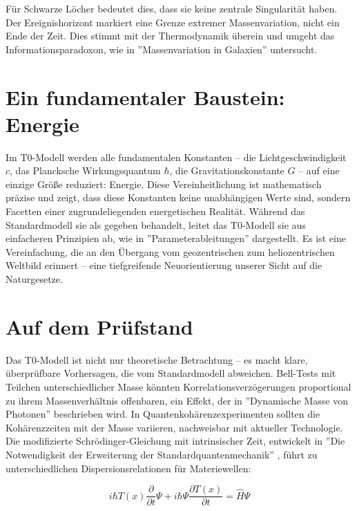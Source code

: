 \documentclass[a4paper,12pt]{article}
\newcommand{\Tfield}{T(x)}
\begin{document}
	Für Schwarze Löcher bedeutet dies, dass sie keine zentrale Singularität haben. Der Ereignishorizont markiert eine Grenze extremer Massenvariation, nicht ein Ende der Zeit. Dies stimmt mit der Thermodynamik überein und umgeht das Informationsparadoxon, wie in ''Massenvariation in Galaxien'' \cite{pascher_galaxies_2025} untersucht.
	
	\section{Ein fundamentaler Baustein: Energie}
	
	Im T0-Modell werden alle fundamentalen Konstanten – die Lichtgeschwindigkeit \(c\), das Plancksche Wirkungsquantum \(\hbar\), die Gravitationskonstante \(G\) – auf eine einzige Größe reduziert: Energie. Diese Vereinheitlichung ist mathematisch präzise und zeigt, dass diese Konstanten keine unabhängigen Werte sind, sondern Facetten einer zugrundeliegenden energetischen Realität. Während das Standardmodell sie als gegeben behandelt, leitet das T0-Modell sie aus einfacheren Prinzipien ab, wie in ''Parameterableitungen'' \cite{pascher_params_2025} dargestellt. Es ist eine Vereinfachung, die an den Übergang vom geozentrischen zum heliozentrischen Weltbild erinnert – eine tiefgreifende Neuorientierung unserer Sicht auf die Naturgesetze.
	
	\section{Auf dem Prüfstand}
	
	Das T0-Modell ist nicht nur theoretische Betrachtung – es macht klare, überprüfbare Vorhersagen, die vom Standardmodell abweichen. Bell-Tests mit Teilchen unterschiedlicher Masse könnten Korrelationsverzögerungen proportional zu ihrem Massenverhältnis offenbaren, ein Effekt, der in ''Dynamische Masse von Photonen'' \cite{pascher_photons_2025} beschrieben wird. In Quantenkohärenzexperimenten sollten die Kohärenzzeiten mit der Masse variieren, nachweisbar mit aktueller Technologie. Die modifizierte Schrödinger-Gleichung mit intrinsischer Zeit, entwickelt in ''Die Notwendigkeit der Erweiterung der Standardquantenmechanik'' \cite{pascher_quantum_2025}, führt zu unterschiedlichen Dispersionsrelationen für Materiewellen:
	
	\begin{equation}
		i\hbar \Tfield \frac{\partial}{\partial t} \Psi + i\hbar \Psi \frac{\partial \Tfield}{\partial t} = \hat{H} \Psi
	\end{equation}
	
\end{document}

